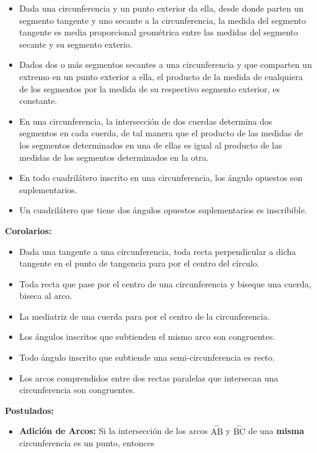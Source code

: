 \documentclass[•]{article}
\begin{document}
\begin{flushleft}
\begin{itemize}
			\item Dada una circunferencia y un punto exterior da ella, desde donde parten un segmento tangente y uno secante a la circunferencia, la medida del segmento tangente es media proporcional geom\'etrica entre las medidas del segmento secante y su segmento exterio.
			
			\item Dados dos o m\'as segmentos secantes a una circunferencia y que comparten un extremo en un punto exterior a ella, el producto de la medida de cualquiera de los segmentos por la medida de su respectivo segmento exterior, es constante.
			
			\item En una circunferencia, la intersecci\'on de dos cuerdas determina dos segmentos en cada cuerda, de tal manera que el producto de las medidas de los segmentos determinados en una de ellas es igual al producto de las medidas de los segmentos determinados en la otra.
			
			\item En todo cuadril\'atero inscrito en una circunferencia, los \'angulo opuestos son suplementarios.
			
			\item Un cuadril\'atero que tiene dos \'angulos opuestos suplementarios es inscribible.
			
		\end{itemize}
		
		\textbf{Corolarios: }
		\begin{itemize}
			\item Dada una tangente a una circunferencia, toda recta perpendicular a dicha tangente en el punto de tangencia para por el centro del c\'irculo.
			\item Toda recta que pase por el centro de una circunferencia y biseque una cuerda, biseca al arco.
			\item La mediatriz de una cuerda para por el centro de la circunferencia.
			\item Los \'angulos inscritos que subtienden el mismo arco son congruentes.
			\item Todo \'angulo inscrito que subtiende una semi-circunferencia es recto.
			\item Los arcos comprendidos entre dos rectas paralelas que intersecan una circunferencia son congruentes.
		\end{itemize}
		
		
		\textbf{Postulados: }
		\begin{itemize}
			\item \textbf{Adici\'on de Arcos: }Si la intersecci\'on de los arcos  $\stackrel{\textstyle\frown}{\mathrm{AB}}$ y $\stackrel{\textstyle\frown}{\mathrm{BC}}$ de una \textbf{misma} circunferencia es un punto, entonces 
		\end{itemize}
	\end{flushleft}
\end{document}
